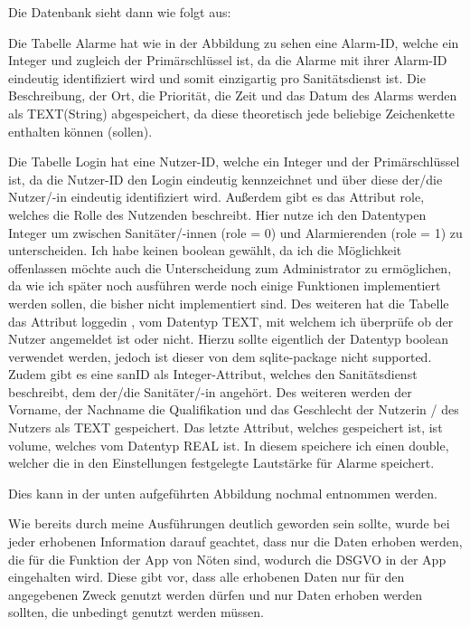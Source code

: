 
    \vspace{5mm}
    Die Datenbank sieht dann wie folgt aus: 

    \vspace{5mm}
    Die Tabelle Alarme hat wie in der Abbildung zu sehen eine Alarm-ID, welche ein Integer und 
    zugleich der Primärschlüssel ist, da die Alarme mit ihrer Alarm-ID eindeutig identifiziert 
    wird und somit einzigartig pro Sanitätsdienst ist. Die Beschreibung, der Ort, die Priorität, 
    die Zeit und das Datum des Alarms werden als TEXT(String) abgespeichert, da diese theoretisch 
    jede beliebige Zeichenkette enthalten können (sollen).

    Die Tabelle Login hat eine Nutzer-ID, welche ein Integer und der Primärschlüssel ist, da die 
    Nutzer-ID den Login eindeutig kennzeichnet und über diese der/die Nutzer/-in eindeutig 
    identifiziert wird. Außerdem gibt es das Attribut role, welches die Rolle des Nutzenden 
    beschreibt. Hier nutze ich den Datentypen Integer um zwischen Sanitäter/-innen (role = 0) und 
    Alarmierenden (role = 1) zu unterscheiden. Ich habe keinen boolean gewählt, da ich die 
    Möglichkeit offenlassen möchte auch die Unterscheidung zum Administrator zu ermöglichen, da 
    wie ich später noch ausführen werde noch einige Funktionen implementiert werden sollen, die 
    bisher nicht implementiert sind. Des weiteren hat die Tabelle das Attribut \glqq loggedin
    \grqq{}, vom Datentyp TEXT, mit welchem ich überprüfe ob der Nutzer angemeldet ist oder 
    nicht. Hierzu sollte eigentlich der Datentyp boolean verwendet werden, jedoch ist dieser von 
    dem sqlite-package nicht supported\cite{sqlite-Datatypes}. Zudem gibt es eine sanID als 
    Integer-Attribut, welches den Sanitätsdienst beschreibt, dem der/die Sanitäter/-in angehört.
    Des weiteren werden der Vorname, der Nachname die Qualifikation und das Geschlecht der 
    Nutzerin / des Nutzers als TEXT gespeichert. Das letzte Attribut, welches gespeichert ist, 
    ist volume, welches vom Datentyp REAL ist. In diesem speichere ich einen double, welcher die 
    in den Einstellungen festgelegte Lautstärke für Alarme speichert.

    Dies kann in der unten aufgeführten Abbildung nochmal entnommen werden.

    Wie bereits durch meine Ausführungen deutlich geworden sein sollte, wurde bei jeder 
    erhobenen Information darauf geachtet, dass nur die Daten erhoben werden, die für die 
    Funktion der App von Nöten sind, wodurch die DSGVO in der App eingehalten wird.
    Diese gibt vor, dass alle erhobenen Daten nur für den angegebenen Zweck genutzt werden dürfen 
    und nur Daten erhoben werden sollten, die unbedingt genutzt werden müssen\cite{DSGVO}.